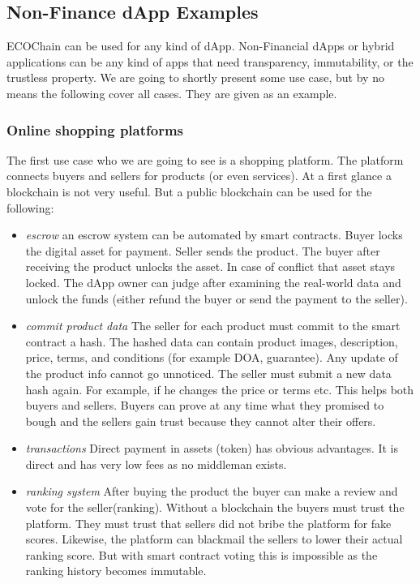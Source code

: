 \documentclass{article}
\begin{document}
\subsection{Non-Finance dApp Examples}
ECOChain can be used for any kind of dApp. Non-Financial dApps or hybrid applications can be any kind of apps that need transparency, immutability, or the trustless property. We are going to shortly present some use case, but by no means the following cover all cases. They are given as an example.
\subsubsection{Online shopping platforms}
The first use case who we are going to see is a shopping platform. The platform connects buyers and sellers for products (or even services). At a first glance a blockchain is not very useful. But a public blockchain can be used for the following:
\begin{itemize}
\item \emph{escrow}
an escrow system can be automated by smart contracts. Buyer locks the digital asset for payment. Seller sends the product. The buyer after receiving the product unlocks the asset. In case of conflict that asset stays locked. The dApp owner can judge after examining the real-world data and unlock the funds (either refund the buyer or send the payment to the seller).
\item \emph{commit product data}
The seller for each product must commit to the smart contract a hash. The hashed data can contain product images, description, price, terms, and conditions (for example DOA, guarantee). Any update of the product info cannot go unnoticed. The seller must submit a new data hash again. For example, if he changes the price or terms etc. This helps both buyers and sellers. Buyers can prove at any time what they promised to bough and the sellers gain trust because they cannot alter their offers.
\item \emph{transactions}
Direct payment in assets (token) has obvious advantages. It is direct and has very low fees as no middleman exists.
\item \emph{ranking system}
After buying the product the buyer can make a review and vote for the seller(ranking). Without a blockchain the buyers must trust the platform. They must trust that sellers did not bribe the platform for fake scores. Likewise, the platform can blackmail the sellers to lower their actual ranking score. But with smart contract voting this is impossible as the ranking history becomes immutable.
\end{itemize}
\end{document}
